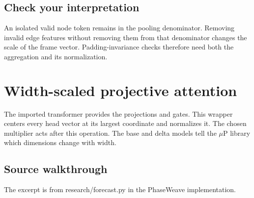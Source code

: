 \documentclass[11pt,oneside,openany]{book}
\begin{document}
\section*{Check your interpretation}
An isolated valid node token remains in the pooling denominator. Removing invalid edge features without removing them from that denominator changes the scale of the frame vector. Padding-invariance checks therefore need both the aggregation and its normalization.

\chapter{Width-scaled projective attention}
The imported transformer provides the projections and gates. This wrapper centers every head vector at its largest coordinate and normalizes it. The chosen multiplier acts after this operation. The base and delta models tell the \ensuremath{\mu}P library which dimensions change with width.

\section*{Source walkthrough}
The excerpt is from research/forecast.py in the PhaseWeave implementation.
\end{document}
